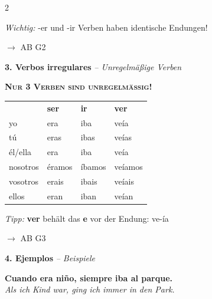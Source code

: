 \documentclass[11pt, a4paper]{article}
\newcommand{\seriftext}[1]{{\fontfamily{ppl}\selectfont #1}}
\newcommand{\es}[1]{\seriftext{\textbf{#1}}}
\newcommand{\de}[1]{\textit{\textcolor{akzent}{#1}}}
\newcommand{\gram}[1]{\textsc{#1}}
\newcommand{\abmark}[1]{{\footnotesize\textcolor{akzent}{$\rightarrow$ AB #1}}}
\newcommand{\abschnitt}[2]{\noindent\textbf{\large #1. #2}}
\newcommand{\stamm}[1]{\textcolor{colorrojo}{#1}}
\begin{document}
\begin{multicols}{2}
\begin{tippbox}
\footnotesize\textit{Wichtig:} -er und -ir Verben haben identische Endungen!
\end{tippbox}

\abmark{G2}

\columnbreak

\abschnitt{3}{Verbos irregulares} \de{-- Unregelmäßige Verben}

\vspace{4pt}

\begin{grammatikbox}
\textbf{\gram{Nur 3 Verben sind unregelmäßig!}}

\vspace{4pt}
{\small
\begin{tabular}{@{}llll@{}}
& \textbf{ser} & \textbf{ir} & \textbf{ver} \\[0.3em]
yo & \stamm{era} & \stamm{iba} & \stamm{veía} \\[0.3em]
tú & \stamm{eras} & \stamm{ibas} & \stamm{veías} \\[0.3em]
él/ella & \stamm{era} & \stamm{iba} & \stamm{veía} \\[0.3em]
nosotros & \stamm{éramos} & \stamm{íbamos} & \stamm{veíamos} \\[0.3em]
vosotros & \stamm{erais} & \stamm{ibais} & \stamm{veíais} \\[0.3em]
ellos & \stamm{eran} & \stamm{iban} & \stamm{veían} \\
\end{tabular}}
\end{grammatikbox}

\begin{tippbox}
\footnotesize\textit{Tipp:} \es{ver} behält das \textbf{e} vor der Endung: ve-ía
\end{tippbox}

\abmark{G3}

\vspace{8pt}

\abschnitt{4}{Ejemplos} \de{-- Beispiele}

\vspace{4pt}

\begin{vokabelbox}
{\small
\es{Cuando era niño, siempre iba al parque.}\\
\de{Als ich Kind war, ging ich immer in den Park.}

}
\end{vokabelbox}
\end{multicols}
\end{document}

